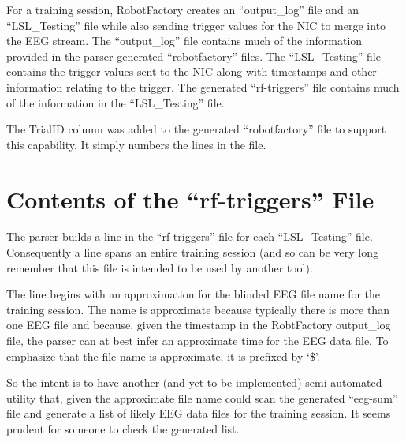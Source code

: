 \documentclass[letterpaper,10pt,english]{sphinxmanual}
\begin{document}
For a training session, RobotFactory creates an “output\_log” file and
an “LSL\_Testing” file while also sending trigger values for the NIC to
merge into the EEG stream. The “output\_log” file contains much of the
information provided in the parser generated “robotfactory” files. The
“LSL\_Testing” file contains the trigger values sent to the NIC along
with timestamps and other information relating to the trigger. The
generated “rf-triggers” file contains much of the information in the
“LSL\_Testing” file.

The TrialID column was added to the generated “robotfactory” file to
support this capability. It simply numbers the lines in the file.


\section{Contents of the “rf-triggers” File}
\label{\detokenize{Data_Definations_Phase1B:contents-of-the-rf-triggers-file}}
The parser builds a line in the “rf-triggers” file for each
“LSL\_Testing” file. Consequently a line spans an entire training
session (and so can be very long \textendash{} remember that this file is intended
to be used by another tool).

The line begins with an approximation for the blinded EEG file name for
the training session. The name is approximate because typically there is
more than one EEG file and because, given the timestamp in the
RobtFactory output\_log file, the parser can at best infer an
approximate time for the EEG data file. To emphasize that the file name
is approximate, it is prefixed by ‘\$’.

So the intent is to have another (and yet to be implemented)
semi-automated utility that, given the approximate file name could scan
the generated “eeg-sum” file and generate a list of likely EEG data
files for the training session. It seems prudent for someone to check
the generated list.
\end{document}
